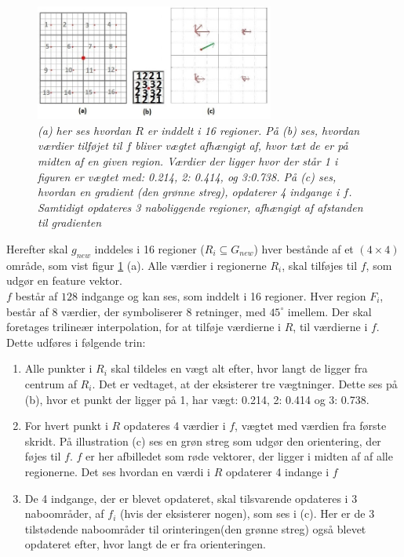 \begin{figure}[H]
    \centering
    \includegraphics[width=0.70\textwidth]{fig/tilsift.jpg}
     \vspace{-1em}
    \begin{center}    
       \caption{{\footnotesize \textit{(a) her ses hvordan $R$ er inddelt i 16 regioner. På (b) ses, hvordan værdier tilføjet til $f$ bliver vægtet afhængigt af, hvor tæt de er på midten af en given region. Værdier der ligger hvor der står 1 i figuren er vægtet med: 0.214, 2: 0.414, og 3:0.738. På (c) ses, hvordan en gradient (den grønne streg), opdaterer 4 indgange i $f$. Samtidigt opdateres 3 naboliggende regioner, afhængigt af afstanden til gradienten}}}
    \label{trilinear}
     \end{center}
     \vspace{-2.5em}
  \end{figure} \noindent
Herefter skal $g_{new}$ inddeles i 16 regioner ($R_{i} \subseteq G_{new}$) hver bestånde af et $(4\times 4)$ område, som vist figur \ref{trilinear} (a). Alle værdier i regionerne $R_i$, skal tilføjes til $f$, som udgør en feature vektor.
\\
$f$ består af $128$ indgange og kan ses, som inddelt i 16 regioner. Hver region $F_i$, består af 8 værdier, der symboliserer 8 retninger, med $45^\circ$ imellem. Der skal foretages trilineær interpolation, for at tilføje værdierne i $R$, til værdierne i $f$. Dette udføres i følgende trin:
\begin{enumerate}
\item{Alle punkter i $R_{i}$ skal tildeles en vægt alt efter, hvor langt de ligger fra centrum af $R_{i}$. Det er vedtaget, at der eksisterer tre vægtninger. Dette ses på (b), hvor et punkt der ligger på  1, har vægt: 0.214, 2: 0.414 og 3: 0.738.}
\item{For hvert punkt i $R$ opdateres 4 værdier i $f$, vægtet med værdien fra første skridt. På illustration (c) ses en grøn streg som udgør den orientering, der føjes til $f$. $f$ er her afbilledet som røde vektorer, der ligger i midten af af alle regionerne. Det ses hvordan en værdi i $R$ opdaterer 4 indange i $f$}
\item{De 4 indgange, der er blevet opdateret, skal tilsvarende opdateres i 3 naboområder, af $f_i$ (hvis der eksisterer nogen), som ses i (c). Her er de 3 tilstødende naboområder til orinteringen(den grønne streg) også blevet opdateret efter, hvor langt de er fra orienteringen.}
\end{enumerate}

